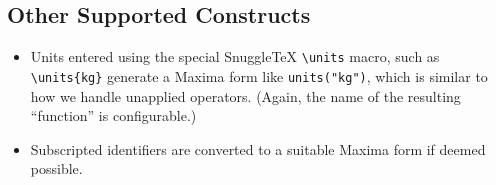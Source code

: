 \ue{\verb|+|}
\ue{\verb|\not=|}
\ue{\verb|\not<|}

\subsection*{Other Supported Constructs}

\begin{itemize}
\item
  Units entered using the special SnuggleTeX \verb|\units| macro, such as
  \verb|\units{kg}| generate a Maxima form like \verb|units("kg")|, which
  is similar to how we handle unapplied operators. (Again, the name of
  the resulting ``function'' is configurable.)

\item
  Subscripted identifiers are converted to a suitable Maxima form if
  deemed possible.


\end{itemize}

